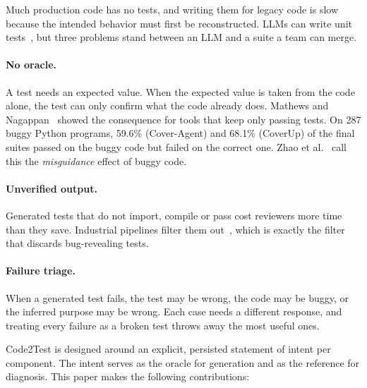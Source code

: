 \documentclass[11pt]{article}
\newcommand{\toolname}{Code2Test}
\begin{document}
Much production code has no tests, and writing them for legacy code is slow because the intended behavior must first be reconstructed.
LLMs can write unit tests~\cite{schafer2024testpilot,yuan2024chattester,pizzorno2025coverup}, but three problems stand between an LLM and a suite a team can merge.

\paragraph{No oracle.}
A test needs an expected value.
When the expected value is taken from the code alone, the test can only confirm what the code already does.
Mathews and Nagappan~\cite{mathews2024design} showed the consequence for tools that keep only passing tests.
On 287 buggy Python programs, 59.6\% (Cover-Agent) and 68.1\% (CoverUp) of the final suites passed on the buggy code but failed on the correct one.
Zhao et al.~\cite{zhao2026misguidance} call this the \emph{misguidance} effect of buggy code.

\paragraph{Unverified output.}
Generated tests that do not import, compile or pass cost reviewers more time than they save.
Industrial pipelines filter them out~\cite{alshahwan2024testgenllm}, which is exactly the filter that discards bug-revealing tests.

\paragraph{Failure triage.}
When a generated test fails, the test may be wrong, the code may be buggy, or the inferred purpose may be wrong.
Each case needs a different response, and treating every failure as a broken test throws away the most useful ones.

\medskip
\toolname{} is designed around an explicit, persisted statement of intent per component.
The intent serves as the oracle for generation and as the reference for diagnosis.
This paper makes the following contributions:
\end{document}
